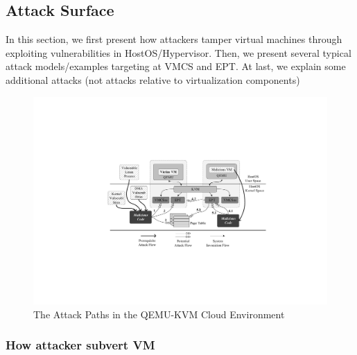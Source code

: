 \subsection{Attack Surface}\label{sub:attacksurface}

In this section, we first present how attackers tamper virtual machines through exploiting vulnerabilities in HostOS/Hypervisor. Then, we present several typical attack models/examples targeting at VMCS and EPT. At last, we explain some additional attacks (not attacks relative to virtualization components)

\begin{figure}[htpb]
    \centering
    \includegraphics[width=1\linewidth]{IMG/threat.pdf}
    \caption{The Attack Paths in the QEMU-KVM Cloud Environment}%
    \label{fig:threat}
\end{figure}


\subsubsection{How attacker subvert VM}

